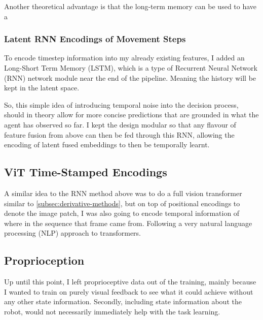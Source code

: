 Another theoretical advantage is that the long-term memory can be used to have a 

\subsubsection{Latent RNN Encodings of Movement Steps}
To encode timestep information into my already existing features, I added an Long-Short Term Memory (LSTM), which is a type of Recurrent Neural Network (RNN)  network module near the end of the pipeline. Meaning the history will be kept in the latent space.

So, this simple idea of introducing temporal noise into the decision process, should in theory allow for more concise predictions that are grounded in what the agent has observed so far. I kept the design modular so that any flavour of feature fusion from above can then be fed through this RNN, allowing the encoding of latent fused embeddings to then be temporally learnt.

\subsection{ViT Time-Stamped Encodings}
A similar idea to the RNN method above was to do a full vision transformer similar to \ref{subsec:derivative-methods}, but on top of positional encodings to denote the image patch, I was also going to encode temporal information of where in the sequence that frame came from. Following a very natural language processing (NLP) approach to transformers.




\subsection{Proprioception}
Up until this point, I left proprioceptive data out of the training, mainly because I wanted to train on purely visual feedback to see what it could achieve without any other state information. Secondly, including state information about the robot, would not necessarily immediately help with the task learning. 

